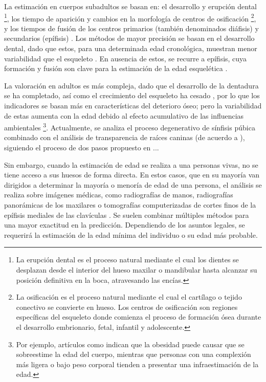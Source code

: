 La estimación en cuerpos subadultos se basan en: el desarrollo y erupción dental
\footnote{
    La erupción dental es el proceso natural mediante el cual los dientes se desplazan desde el interior del 
    hueso maxilar o mandibular hasta alcanzar su posición definitiva en la boca, atravesando las encías.
}, 
los tiempo de aparición y cambios en la morfología de centros de osificación
\footnote{
    La osificación es el proceso natural mediante el cual el cartílago o tejido conectivo se convierte en 
    hueso. Los centros de osificación son regiones específicas del esqueleto donde comienza el proceso de 
    formación ósea durante el desarrollo embrionario, fetal, infantil y adolescente.
},
y los tiempos de fusión de los centros primarios (también denominados diáfisis) y secundarios (epífisis) 
\cite{scheuer2000, adserias2019}. 
Los métodos de mayor precisión se basan en el desarrollo dental, dado que estos, para una determinada
edad cronológica, muestran menor variabilidad que el esqueleto \cite{bowman1992}. En ausencia de estos, 
se recurre a epífisis, cuya formación y fusión son clave para la estimación de la edad esquelética 
\cite{adserias2019}.

La valoración en adultos es más compleja, dado que el desarrollo de la dentadura se ha completado, 
así como el crecimiento del esqueleto ha cesado \cite{byers2023}, por lo que los indicadores 
se basan más en características del deterioro óseo; pero la variabilidad de estas aumenta con la 
edad debido al efecto acumulativo de las influencias ambientales \cite{ubelaker2018, scheuer2004} 
\footnote{
    Por ejemplo, artículos como \cite{merritt2015,wescott2015} indican que la obesidad puede causar que se 
    sobreestime la edad del cuerpo, mientras que personas con una complexión más ligera o bajo peso corporal 
    tienden a presentar una infraestimación de la edad.
}. 
Actualmente, se analiza el proceso degenerativo de sínfisis púbica combinado con el análisis de transparencia 
de raíces caninas (de acuerdo a ), siguiendo el proceso de dos pasos propuesto en ...

Sin embargo, cuando la estimación de edad se realiza a una personas vivas, no se tiene acceso a sus 
huesos de forma directa. En estos casos, que en su mayoría van dirigidos a determinar la mayoría o menoría de 
edad de una persona, el análisis se realiza sobre imágenes médicas, como radiografías de manos, radiografías 
panorámicas de los maxilares o tomografías computerizadas de cortes finos de la epífisis mediales de las 
clavículas \cite{schmeling2016}. Se suelen combinar múltiples métodos para una mayor exactitud en la 
predicción. Dependiendo de los asuntos legales, se requerirá la estimación de la edad mínima del individuo o 
su edad más probable.




